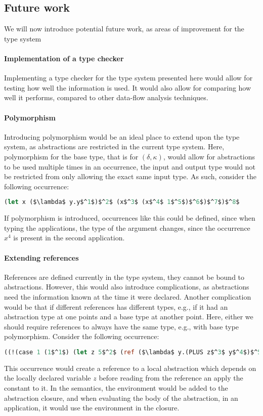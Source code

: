\documentclass[../../master.tex]{subfiles}
\begin{document}
\subsection{Future work}\label{sec:FW}
We will now introduce potential future work, as areas of improvement for the type system

\paragraph{Implementation of a type checker}
Implementing a type checker for the type system presented here would allow for testing how well the information is used.
It would also allow for comparing how well it performs, compared to other data-flow analysis techniques.

\paragraph{Polymorphism}
Introducing polymorphism would be an ideal place to extend upon the type system, as abstractions are restricted in the current type system.
Here, polymorphism for the base type, that is for $(\delta,\kappa)$, would allow for abstractions to be used multiple times in an occurrence, the input and output type would not be restricted from only allowing the exact same input type.
As such, consider the following occurrence:
\begin{lstlisting}[language=Caml, mathescape=true]
(let x ($\lambda$ y.y$^1$)$^2$ (x$^3$ (x$^4$ 1$^5$)$^6$)$^7$)$^8$
\end{lstlisting}
If polymorphism is introduced, occurrences like this could be defined, since when typing the applications, the type of the argument changes, since the occurrence $x^4$ is present in the second application.


\paragraph{Extending references}
References are defined currently in the type system, they cannot be bound to abstractions.
However, this would also introduce complications, as abstractions need the information known at the time it were declared.
Another complication would be that if different references has different types, e.g., if it had an abstraction type at one points and a base type at another point.
Here, either we should require references to always have the same type, e.g., with base type polymorphism.
Consider the following occurrence:
\begin{lstlisting}[language=Caml, mathescape=true]
((!(case 1 (1$^1$) (let z 5$^2$ (ref ($\lambda$ y.(PLUS z$^3$ y$^4$)$^5$)$^6$))$^7$)$^8$)$^9$ 5)$^{10}$
\end{lstlisting}
This occurrence would create a reference to a local abstraction which depends on the locally declared variable $z$ before reading from the reference an apply the constant to it.
In the semantics, the environment would be added to the abstraction closure, and when evaluating the body of the abstraction, in an application, it would use the environment in the closure.
\end{document}
